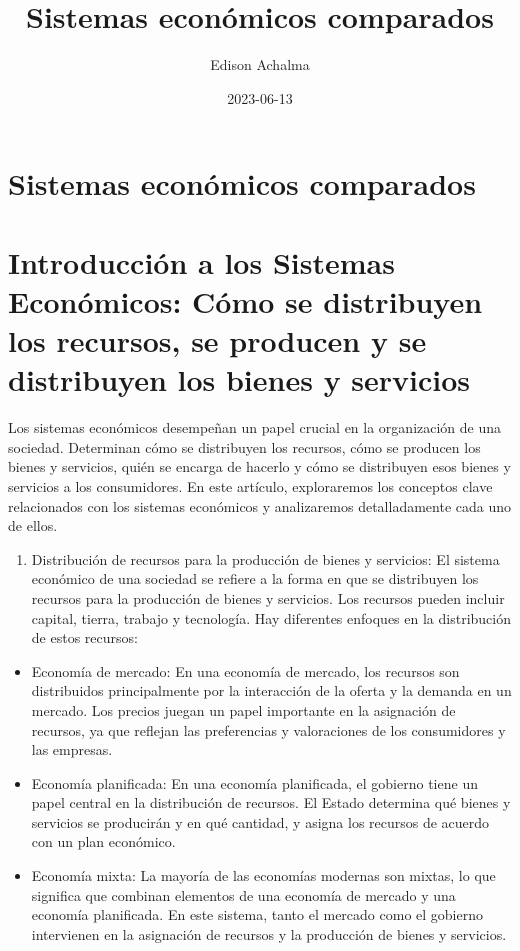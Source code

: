\documentclass[
  man,
  floatsintext,
  longtable,
  a4paper,
  nolmodern,
  notxfonts,
  notimes,
  12pt,
  colorlinks=true,linkcolor=blue,citecolor=blue,urlcolor=blue]{apa7}
\title{Sistemas económicos comparados}
\author{Edison Achalma}
\affiliation{
{Escuela Profesional de Economía, Universidad Nacional de San Cristóbal
de Huamanga}}
\date{2023-06-13}
\providecommand{\tightlist}{%
  \setlength{\itemsep}{0pt}\setlength{\parskip}{0pt}}
\begin{document}
\maketitle


\hypertarget{toc}{}
\tableofcontents
\newpage
\section[Introduction]{Sistemas económicos comparados}

\setcounter{secnumdepth}{3}

\setlength\LTleft{0pt}




\section{Introducción a los Sistemas Económicos: Cómo se distribuyen los
recursos, se producen y se distribuyen los bienes y
servicios}\label{introducciuxf3n-a-los-sistemas-econuxf3micos-cuxf3mo-se-distribuyen-los-recursos-se-producen-y-se-distribuyen-los-bienes-y-servicios}

Los sistemas económicos desempeñan un papel crucial en la organización
de una sociedad. Determinan cómo se distribuyen los recursos, cómo se
producen los bienes y servicios, quién se encarga de hacerlo y cómo se
distribuyen esos bienes y servicios a los consumidores. En este
artículo, exploraremos los conceptos clave relacionados con los sistemas
económicos y analizaremos detalladamente cada uno de ellos.

\begin{enumerate}
\def\labelenumi{\arabic{enumi}.}
\tightlist
\item
  Distribución de recursos para la producción de bienes y servicios: El
  sistema económico de una sociedad se refiere a la forma en que se
  distribuyen los recursos para la producción de bienes y servicios. Los
  recursos pueden incluir capital, tierra, trabajo y tecnología. Hay
  diferentes enfoques en la distribución de estos recursos:
\end{enumerate}

\begin{itemize}
\item
  Economía de mercado: En una economía de mercado, los recursos son
  distribuidos principalmente por la interacción de la oferta y la
  demanda en un mercado. Los precios juegan un papel importante en la
  asignación de recursos, ya que reflejan las preferencias y
  valoraciones de los consumidores y las empresas.
\item
  Economía planificada: En una economía planificada, el gobierno tiene
  un papel central en la distribución de recursos. El Estado determina
  qué bienes y servicios se producirán y en qué cantidad, y asigna los
  recursos de acuerdo con un plan económico.
\item
  Economía mixta: La mayoría de las economías modernas son mixtas, lo
  que significa que combinan elementos de una economía de mercado y una
  economía planificada. En este sistema, tanto el mercado como el
  gobierno intervienen en la asignación de recursos y la producción de
  bienes y servicios.
\end{itemize}
\end{document}
